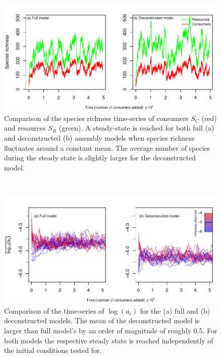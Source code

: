 \documentclass[a4paper]{report}
\DeclareMathOperator{\log}{log}
\begin{document}
\begin{figure}[H]
\centering{}
\includegraphics[scale=1]{../Images/animal_plants.pdf}
\caption{Comparison of the species richness time-series of consumers $S_C$ (red) and resources $S_R$ (green). A steady-state is reached for both full (a) and deconstructed (b) assembly models when species richness fluctuates around a constant mean. The average number of species during the steady state is slightly larger for the deconstructed model. \label{fig:spec_rich_time}}
\end{figure}\\

\begin{figure}[H]

\centering{}\includegraphics[scale=1]{../Images/agg_time_series.pdf}
 \caption{ Comparison of the time-series of $\log(\overline{a_{i}})$
    for the (a) full and (b) deconstructed models. The mean of the deconstructed model is larger than full model's by an order of magnitude of roughly 0.5. For both models the respective steady state is reached independently of the initial conditions tested for.\label{fig:agg-through-time}}
\end{figure}
\end{document}
